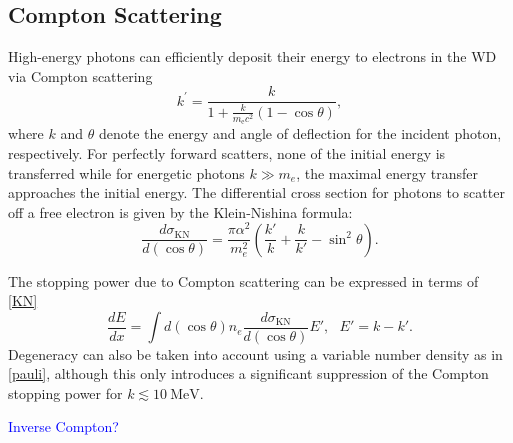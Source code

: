 \documentclass[twocolumn,showpacs,preprintnumbers,amsmath,amssymb,prd]{revtex4}
\def\r{\right)}
\def\l{\left(}
\begin{document}
\begin{appendices}
\subsection*{Compton Scattering}
High-energy photons can efficiently deposit their energy to electrons in the WD via Compton scattering
\begin{equation}
{k^{\prime }={\frac {k}{1+{\frac {k}{m_{\text{e}}c^{2}}}(1-\cos \theta )}}},
\end{equation}
where $k$ and $\theta$ denote the energy and angle of deflection for the incident photon, respectively. For perfectly forward scatters, none of the initial energy is transferred while for energetic photons $k \gg m_e$, the maximal energy transfer approaches the initial energy. The differential cross section for photons to scatter off a free electron is given by the Klein-Nishina formula:
\begin{equation}
\label{KN}
\frac{d\sigma_\text{KN}}{d (\cos \theta)}=\frac{\pi \alpha^2}{m_e^2} \l \frac{k'}{k} + \frac{k}{k'} -\sin^2 \theta \r.
\end{equation}

The stopping power due to Compton scattering can be expressed in terms of \eqref{KN}
\begin{equation}
\frac{dE}{dx} =  \int d (\cos \theta) n_e \frac{d\sigma_\text{KN}}{d (\cos \theta)} E', ~~~ E' = k - k'.
\end{equation}
Degeneracy can also be taken into account using a variable number density as in \eqref{pauli}, although this only introduces a significant suppression of the Compton stopping power for $k\lesssim 10 ~\text{MeV}$. 

\textcolor{blue}{Inverse Compton?}


\end{appendices}
\end{document}
